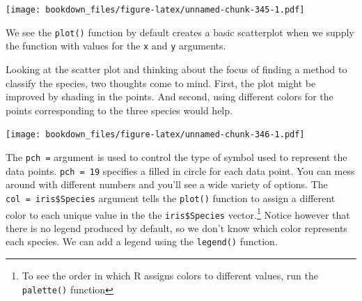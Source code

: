 \documentclass[]{krantz}
\makeatletter
\newenvironment{Shaded}{\begin{snugshade}}{\end{snugshade}}
\newcommand{\KeywordTok}[1]{\textcolor[rgb]{0.27,0.27,0.27}{\textbf{#1}}}
\newcommand{\DataTypeTok}[1]{\textcolor[rgb]{0.27,0.27,0.27}{#1}}
\newcommand{\DecValTok}[1]{\textcolor[rgb]{0.06,0.06,0.06}{#1}}
\newcommand{\FloatTok}[1]{\textcolor[rgb]{0.06,0.06,0.06}{#1}}
\newcommand{\StringTok}[1]{\textcolor[rgb]{0.5,0.5,0.5}{#1}}
\newcommand{\OperatorTok}[1]{\textcolor[rgb]{0.43,0.43,0.43}{\textbf{#1}}}
\newcommand{\NormalTok}[1]{#1}
\newenvironment{kframe}{%
\medskip{}
\setlength{\fboxsep}{.8em}
 \def\at@end@of@kframe{}%
 \ifinner\ifhmode%
  \def\at@end@of@kframe{\end{minipage}}%
  \begin{minipage}{\columnwidth}%
 \fi\fi%
 \def\FrameCommand##1{\hskip\@totalleftmargin \hskip-\fboxsep
 \colorbox{shadecolor}{##1}\hskip-\fboxsep
     \hskip-\linewidth \hskip-\@totalleftmargin \hskip\columnwidth}%
 \MakeFramed {\advance\hsize-\width
   \@totalleftmargin\z@ \linewidth\hsize
   \@setminipage}}%
 {\par\unskip\endMakeFramed%
 \at@end@of@kframe}
\renewenvironment{Shaded}{\begin{kframe}}{\end{kframe}}
\makeatother
\begin{document}
\texttt{[image: bookdown\_files/figure-latex/unnamed-chunk-345-1.pdf]}

We see the \texttt{plot()} function by default creates a basic
scatterplot when we supply the function with values for the \texttt{x}
and \texttt{y} arguments.

Looking at the scatter plot and thinking about the focus of finding a
method to classify the species, two thoughts come to mind. First, the
plot might be improved by shading in the points. And second, using
different colors for the points corresponding to the three species would
help.

\begin{Shaded}
\end{Shaded}

\texttt{[image: bookdown\_files/figure-latex/unnamed-chunk-346-1.pdf]}

The \texttt{pch\ =} argument is used to control the type of symbol used
to represent the data points. \texttt{pch\ =\ 19} specifies a filled in
circle for each data point. You can mess around with different numbers
and you'll see a wide variety of options. The
\texttt{col\ =\ iris\$Species} argument tells the \texttt{plot()}
function to assign a different color to each unique value in the the
\texttt{iris\$Species} vector.\footnote{To see the order in which R
  assigns colors to different values, run the \texttt{palette()}
  function} Notice however that there is no legend produced by default,
so we don't know which color represents each species. We can add a
legend using the \texttt{legend()} function.

\begin{Shaded}
\end{Shaded}
\end{document}
